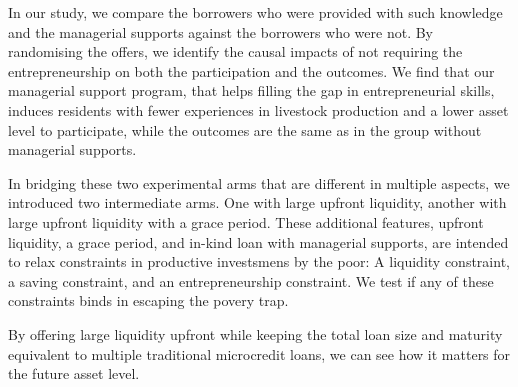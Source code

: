 	In our study, we compare the borrowers who were provided with such knowledge and the managerial supports against the borrowers who were not. By randomising the offers, we identify the causal impacts of not requiring the entrepreneurship on both the participation and the outcomes. We find that our managerial support program, that helps filling the gap in entrepreneurial skills, induces residents with fewer experiences in livestock production and a lower asset level to participate, while the outcomes are the same as in the group without managerial supports.%

	In bridging these two experimental arms that are different in multiple aspects, we introduced two intermediate arms. One with large upfront liquidity, another with large upfront liquidity with a grace period. These additional features, upfront liquidity, a grace period, and in-kind loan with managerial supports, are intended to relax constraints in productive investsmens by the poor: A liquidity constraint, a saving constraint, and an entrepreneurship constraint. We test if any of these constraints binds in escaping the povery trap. 
	
	By offering large liquidity upfront while keeping the total loan size and maturity equivalent to multiple traditional microcredit loans, we can see how it matters for the future asset level. 

